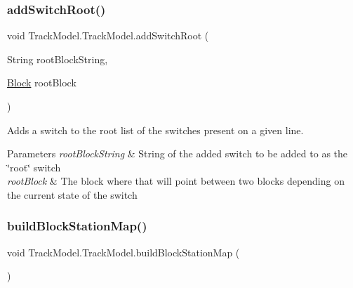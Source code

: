 \mbox{\label{classTrackModel_1_1TrackModel_ab7bbc240d2612ca3709889f75cf1d40e}} 
\subsubsection{\texorpdfstring{add\+Switch\+Root()}{addSwitchRoot()}}
{\footnotesize\ttfamily void Track\+Model.\+Track\+Model.\+add\+Switch\+Root (\begin{DoxyParamCaption}\item[{String}]{root\+Block\+String,  }\item[{\hyperlink{classTrackModel_1_1Block}{Block}}]{root\+Block }\end{DoxyParamCaption})\hspace{0.3cm}{\ttfamily [private]}}



Adds a switch to the root list of the switches present on a given line. 


\begin{DoxyParams}{Parameters}
{\em root\+Block\+String} & String of the added switch to be added to as the \char`\"{}root\char`\"{} switch \\
\hline
{\em root\+Block} & The block where that will point between two blocks depending on the current state of the switch \\
\hline
\end{DoxyParams}
\mbox{\label{classTrackModel_1_1TrackModel_a09958c9377126378d1efe5054e246405}} 
\subsubsection{\texorpdfstring{build\+Block\+Station\+Map()}{buildBlockStationMap()}}
{\footnotesize\ttfamily void Track\+Model.\+Track\+Model.\+build\+Block\+Station\+Map (\begin{DoxyParamCaption}{ }\end{DoxyParamCaption})\hspace{0.3cm}{\ttfamily [private]}}



